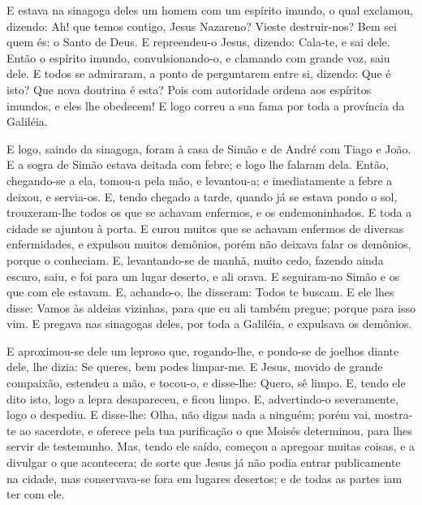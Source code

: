 E estava na sinagoga deles um homem com um espírito imundo, o
qual exclamou, dizendo: Ah! que temos contigo, Jesus
Nazareno? Vieste destruir-nos? Bem sei quem és: o Santo de Deus.
E repreendeu-o Jesus, dizendo: Cala-te, e sai dele.
Então o espírito imundo, convulsionando-o, e clamando com
grande voz, saiu dele. E todos se admiraram, a ponto de
perguntarem entre si, dizendo: Que é isto? Que nova doutrina é esta?
Pois com autoridade ordena aos espíritos imundos, e eles lhe
obedecem! E logo correu a sua fama por toda a província da
Galiléia.

E logo, saindo da sinagoga, foram à casa de Simão e de André com
Tiago e João. E a sogra de Simão estava deitada com febre; e
logo lhe falaram dela. Então, chegando-se a ela, tomou-a pela
mão, e levantou-a; e imediatamente a febre a deixou, e servia-os.
E, tendo chegado a tarde, quando já se estava pondo o sol,
trouxeram-lhe todos os que se achavam enfermos, e os endemoninhados.
E toda a cidade se ajuntou à porta. E curou muitos que
se achavam enfermos de diversas enfermidades, e expulsou muitos
demônios, porém não deixava falar os demônios, porque o conheciam.
E, levantando-se de manhã, muito cedo, fazendo ainda escuro,
saiu, e foi para um lugar deserto, e ali orava. E seguiram-no
Simão e os que com ele estavam. E, achando-o, lhe disseram:
Todos te buscam. E ele lhes disse: Vamos às aldeias vizinhas,
para que eu ali também pregue; porque para isso vim. E
pregava nas sinagogas deles, por toda a Galiléia, e expulsava os
demônios.

E aproximou-se dele um leproso que, rogando-lhe, e pondo-se de
joelhos diante dele, lhe dizia: Se queres, bem podes limpar-me.
E Jesus, movido de grande compaixão, estendeu a mão, e
tocou-o, e disse-lhe: Quero, sê limpo. E, tendo ele dito
isto, logo a lepra desapareceu, e ficou limpo. E,
advertindo-o severamente, logo o despediu. E disse-lhe: Olha,
não digas nada a ninguém; porém vai, mostra-te ao sacerdote, e
oferece pela tua purificação o que Moisés determinou, para lhes
servir de testemunho. Mas, tendo ele saído, começou a
apregoar muitas coisas, e a divulgar o que acontecera; de sorte que
Jesus já não podia entrar publicamente na cidade, mas conservava-se
fora em lugares desertos; e de todas as partes iam ter com ele.

\medskip

